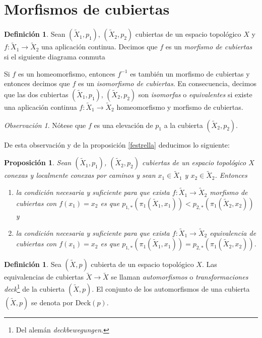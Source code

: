 \documentclass[12pt,a4paper]{book}
\newtheorem{prop}[thm]{Proposición}
\theoremstyle{definition} \newtheorem{defn}[thm]{Definición}
\theoremstyle{definition} \newtheorem{ejemplo}[thm]{Ejemplo}
\theoremstyle{definition} \newtheorem{ejercicio}[thm]{Ejercicio}
\theoremstyle{remark} \newtheorem*{obs}{Observación}
\def\gf{\pi_1}
\def\XX{\tilde{X}}
\def\DD{\mathrm{Deck}}
\begin{document}
\section{Morfismos de cubiertas}
\begin{defn}
  Sean $(\XX_1,p_1)$, $(\XX_2,p_2)$ cubiertas de un espacio topológico $X$ y $f:\XX_1\rightarrow \XX_2$ una aplicación continua. Decimos que $f$ es un \emph{morfismo de cubiertas} si el siguiente diagrama conmuta
  \begin{center}
  \end{center}
  Si $f$ es un homeomorfismo, entonces $f^{-1}$ es también un morfismo de cubiertas y entonces decimos que $f$ es un \emph{isomorfismo de cubiertas}. En consecuencia, decimos que las dos cubiertas $(\XX_1,p_1)$, $(\XX_2,p_2)$ son \emph{isomorfas} o \emph{equivalentes} si existe una aplicación continua $f:\XX_1\rightarrow \XX_2$ homeomorfismo y morfismo de cubiertas. 
\end{defn}
\begin{obs}
  Nótese que $f$ es una elevación de $p_1$ a la cubierta $(\XX_2,p_2)$.
\end{obs}
De esta observación y de la proposición \ref{festrella} deducimos lo siguiente:
\begin{prop}\label{morfcub}
 Sean $(\XX_1,p_1)$, $(\XX_2,p_2)$ cubiertas de un espacio topológico $X$ conexas y localmente conexas por caminos y sean $x_1\in \XX_1$ y $x_2\in \XX_2$. Entonces
 \begin{enumerate}
   \item la condición necesaria y suficiente para que exista $f:\XX_1\rightarrow \XX_2$ morfismo de cubiertas con $f(x_1)=x_2$ es que
     $  p_{1,*}(\gf(\XX_1,x_1))<p_{2,*}(\gf(\XX_2,x_2))$
     y
   \item la condición necesaria y suficiente para que exista $f:\XX_1\rightarrow \XX_2$ equivalencia de cubiertas con $f(x_1)=x_2$ es que
       $p_{1,*}(\gf(\XX_1,x_1))=p_{2,*}(\gf(\XX_2,x_2))$.
 \end{enumerate}
\end{prop}
\begin{defn}
  Sea $(\XX,p)$ cubierta de un espacio topológico $X$. Las equivalencias de cubiertas $\XX\rightarrow \XX$ se llaman \emph{automorfismos} o \emph{transformaciones deck}\footnote{Del alemán \textit{deckbewegungen}.} de la cubierta $(\XX,p)$. El conjunto de los automorfismos de una cubierta $(\XX,p)$ se denota por $\DD(p)$.
\end{defn}
\end{document}
